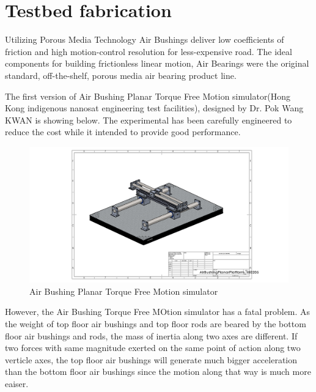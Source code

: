 \section{Testbed fabrication}
Utilizing Porous Media Technology Air Bushings deliver low coefficients of friction and high motion-control resolution for less-expensive road. The ideal components for building frictionless linear motion, Air Bearings were the original standard, off-the-shelf, porous media air bearing product line. 

The first version of Air Bushing Planar Torque Free Motion simulator(Hong Kong indigenous nanosat engineering test facilities), designed by Dr. Pok Wang KWAN is showing below. The experimental has been carefully engineered to reduce the cost while it intended to provide good performance.

\begin{figure}[!b]
\centering
\includegraphics[width=\textwidth]{fig/DOE/AirBushingPlanarPlatform}
\caption{Air Bushing Planar Torque Free Motion simulator}
\end{figure}

However, the Air Bushing Torque Free MOtion simulator has a fatal problem. As the weight of top floor air bushings and top floor rods are beared by the bottom floor air bushings and rods, the mass of inertia along two axes are different. If two forces with same magnitude exerted on the same point of action along two verticle axes, the top floor air bushings will generate much bigger acceleration than the bottom floor air bushings since the motion along that way is much more eaiser.

